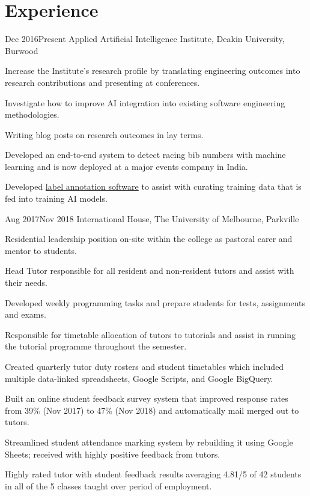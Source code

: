 \vspace{-1.5mm}
\section{Experience}
\vspace{3mm}

\def \asis{A\textsuperscript{2}I\textsuperscript{2}}

{Dec 2016}{Present}
{Applied Artificial Intelligence Institute, Deakin University, Burwood}
{
  \item Increase the Institute's research profile by translating engineering outcomes into research contributions and presenting at conferences.
  \item Investigate how to improve AI integration into existing software engineering methodologies.
  \item Writing blog posts on research outcomes in lay terms.
}
{
  \item Developed an end-to-end system to detect racing bib numbers with machine learning and is now deployed at a major events company in India.
  \item Developed \href{http://deakin.edu.au/~ca/argus}{label annotation software} to assist with curating training data that is fed into training AI models.
}

{Aug 2017}{Nov 2018}
{International House, The University of Melbourne, Parkville}
{
  \item Residential leadership position on-site within the college as pastoral carer and mentor to students.
  \item Head Tutor responsible for all resident and non-resident tutors and assist with their needs.
  \item Developed weekly programming tasks and prepare students for tests, assignments and exams.
  \item Responsible for timetable allocation of tutors to tutorials and assist in running the tutorial programme throughout the semester. 
}
{
  \item Created quarterly tutor duty rosters and student timetables which included multiple data-linked spreadsheets, Google Scripts, and Google BigQuery.
  \item Built an online student feedback survey system that improved response rates from 39\% (Nov 2017) to 47\% (Nov 2018) and automatically mail merged out to tutors.
  \item Streamlined student attendance marking system by rebuilding it using Google Sheets; received with highly positive feedback from tutors.
  \item Highly rated tutor with student feedback results averaging 4.81/5 of 42 students in all of the 5 classes taught over period of employment.
}

